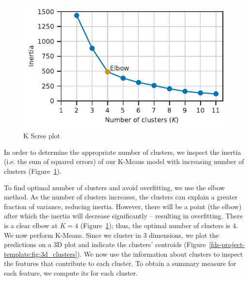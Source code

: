 \documentclass[11pt,a4paper]{article}
\begin{document}
\begin{figure} [h!]
  \centering
  \includegraphics{report/k_screeplot.pdf}
  \caption{K Scree plot}
  \label{fds-project-template:fig:k_screeplot}
\end{figure}
In order to determine the appropriate number of clusters, we inspect the inertia (i.e. the sum of squared errors) of our K-Means model with increasing number of clusters (Figure~\ref{fds-project-template:fig:k_screeplot}). 

To find optimal number of clusters and avoid overfitting, we use the elbow method. As the number of clusters increases, the clusters can explain a greater fraction of variance, reducing inertia. However, there will be a point (the elbow) after which the inertia will decrease significantly \cite{wiki:elbow} – resulting in overfitting. There is a clear elbow at $K = 4$ (Figure~\ref{fds-project-template:fig:k_screeplot}); thus, the optimal number of clusters is 4. We now perform K-Means. Since we cluster in 3 dimensions, we plot the predictions on a 3D plot and indicate the clusters' centroids (Figure~\ref{fds-project-template:fig:3d_clusters}). We now use the information about clusters to inspect the features that contribute to each cluster. To obtain a summary measure for each feature, we compute its for each cluster.
\end{document}
